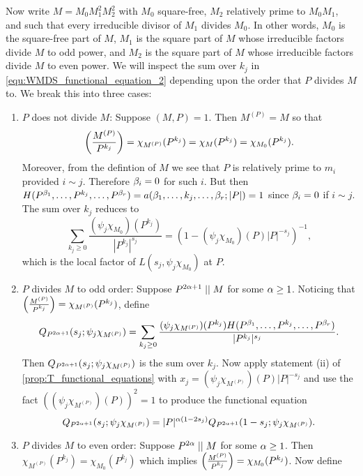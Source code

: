     Now write $M = M_{0}M_{1}^{2}M_{2}^{2}$ with $M_{0}$ square-free, $M_{2}$ relatively prime to $M_{0}M_{1}$, and such that every irreducible divisor of $M_{1}$ divides $M_{0}$. In other words, $M_{0}$ is the square-free part of $M$, $M_{1}$ is the square part of $M$ whose irreducible factors divide $M$ to odd power, and $M_{2}$ is the square part of $M$ whose irreducible factors divide $M$ to even power. We will inspect the sum over $k_{j}$ in \cref{equ:WMDS_functional_equation_2} depending upon the order that $P$ divides $M$ to. We break this into three cases:

    \begin{enumerate}[label=(\roman*)]
        \item $P$ does not divide $M$: Suppose $(M,P) = 1$. Then $M^{(P)} = M$ so that 
        \[
            \left(\frac{M^{(P)}}{P^{k_{j}}}\right) = \chi_{M^{(P)}}(P^{k_{j}}) = \chi_{M}(P^{k_{j}}) = \chi_{M_{0}}(P^{k_{j}}).
        \]
        Moreover, from the defintion of $M$ we see that $P$ is relatively prime to $m_{i}$ provided $i \sim j$. Therefore $\beta_{i} = 0$ for such $i$. But then $H(P^{\beta_{1}},\ldots,P^{k_{j}},\ldots,P^{\beta_{r}}) = a(\beta_{1},\ldots,k_{j},\ldots,\beta_{r};|P|) = 1$ since $\beta_{i} = 0$ if $i \sim j$. The sum over $k_{j}$ reduces to
        \[
            \sum_{k_{j} \ge 0}\frac{(\psi_{j}\chi_{M_{0}})(P^{k_{j}})}{|P^{k_{j}}|^{s_{j}}} = (1-(\psi_{j}\chi_{M_{0}})(P)|P|^{-s_{j}})^{-1},
        \]
        which is the local factor of $L(s_{j},\psi_{j}\chi_{M_{0}})$ at $P$.
        \item $P$ divides $M$ to odd order: Suppose $P^{2\alpha+1} \mid\mid M$ for some $\alpha \ge 1$. Noticing that $\textstyle{\left(\frac{M^{(P)}}{P^{k_{j}}}\right)} = \chi_{M^{(P)}}(P^{k_{j}})$, define 
        \[
            Q_{P^{2\alpha+1}}(s_{j};\psi_{j}\chi_{M^{(P)}}) = \sum_{k_{j} \ge 0}\frac{(\psi_{j}\chi_{M^{(P)}})(P^{k_{j}})H(P^{\beta_{1}},\ldots,P^{k_{j}},\ldots,P^{\beta_{r}})}{|P^{k_{j}}|^{s_{j}}}.
        \]
        Then $Q_{P^{2\alpha+1}}(s_{j};\psi_{j}\chi_{M^{(P)}})$ is the sum over $k_{j}$. Now apply statement (ii) of \cref{prop:T_functional_equations} with $x_{j} = (\psi_{j}\chi_{M^{(P)}})(P)|P|^{-s_{j}}$ and use the fact $((\psi_{j}\chi_{M^{(P)}})(P))^{2} = 1$ to produce the functional equation
        \[
            Q_{P^{2\alpha+1}}(s_{j};\psi_{j}\chi_{M^{(P)}}) = |P|^{\alpha(1-2s_{j})}Q_{P^{2\alpha+1}}(1-s_{j};\psi_{j}\chi_{M^{(P)}}).
        \]
        \item $P$ divides $M$ to even order: Suppose $P^{2\alpha} \mid\mid M$ for some $\alpha \ge 1$. Then $\chi_{M^{(P)}}(P^{k_{j}}) = \chi_{M_{0}}(P^{k_{j}})$ which implies $\textstyle{\left(\frac{M^{(P)}}{P^{k_{j}}}\right)} = \chi_{M_{0}}(P^{k_{j}})$. Now define

\end{enumerate}
